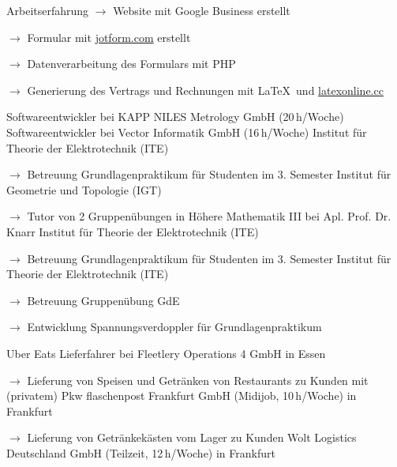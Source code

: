 \begin{rubric}{\textcolor{black!20!blue!100}{Arbeitserfahrung}}
			\setlength{\hangindent}{\widthof{$\rightarrow$ }}
			$\rightarrow$ Website mit Google Business erstellt

			$\rightarrow$ Formular mit \href{https://www.jotform.com/}{jotform.com} erstellt

			$\rightarrow$ Datenverarbeitung des Formulars mit PHP

			$\rightarrow$ Generierung des Vertrags und Rechnungen mit \LaTeX\ und \href{https://latexonline.cc/}{latexonline.cc}
			
		\entry*[10/2024 --- 01/2025]
			Softwareentwickler bei KAPP NILES Metrology GmbH (20\,h/Woche)
		\entry*[05/2016 --- 10/2017]
			Softwareentwickler bei Vector Informatik GmbH (16\,h/Woche)
		\entry*[10/2015 --- 03/2016]
			Institut für Theorie der Elektrotechnik (ITE)
				
			\setlength{\hangindent}{\widthof{$\rightarrow$ }}
			$\rightarrow$ Betreuung Grundlagenpraktikum für Studenten im 3. Semester
		\entry*
			Institut für Geometrie und Topologie (IGT)
			
			\setlength{\hangindent}{\widthof{$\rightarrow$ }}
			$\rightarrow$ Tutor von 2 Gruppenübungen in Höhere Mathematik III bei Apl. Prof. Dr. Knarr
		\entry*[10/2014 --- 03/2015]
			Institut für Theorie der Elektrotechnik (ITE)
			
			\setlength{\hangindent}{\widthof{$\rightarrow$ }}
			$\rightarrow$ Betreuung Grundlagenpraktikum für Studenten im 3. Semester
		\entry*[10/2013 --- 03/2014]
			Institut für Theorie der Elektrotechnik (ITE)
			
			\setlength{\hangindent}{\widthof{$\rightarrow$ }}
			$\rightarrow$ Betreuung Gruppenübung GdE
			
			$\rightarrow$ Entwicklung Spannungsverdoppler für Grundlagenpraktikum
	
		\entry*[29/07/2026 --- 28/09/2026]
			Uber Eats Lieferfahrer bei Fleetlery Operations 4 GmbH in Essen
			
			\setlength{\hangindent}{\widthof{$\rightarrow$ }}
			$\rightarrow$ Lieferung von Speisen und Getränken von Restaurants zu Kunden mit (privatem) Pkw
		\entry*[23/03/2024 --- 26/04/2024]
			flaschenpost Frankfurt GmbH (Midijob, 10\,h/Woche) in Frankfurt
			
			\setlength{\hangindent}{\widthof{$\rightarrow$ }}
			$\rightarrow$ Lieferung von Getränkekästen vom Lager zu Kunden
		\entry*[06/03/2024 --- 30/04/2024]
			Wolt Logistics Deutschland GmbH (Teilzeit, 12\,h/Woche) in Frankfurt
			

\end{rubric}
